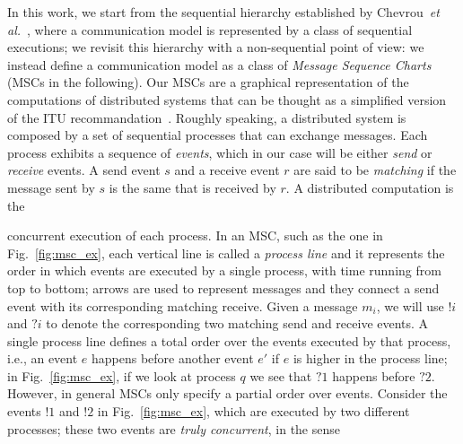 In this work, we start from the sequential hierarchy established by Chevrou~\emph{et al.}~\cite{DBLP:journals/fac/ChevrouHQ16}, where a
communication model is represented by a class of sequential executions; we revisit this hierarchy
with a non-sequential point of view: we instead define a communication model as a class of
\emph{Message Sequence Charts} (MSCs in the following).
Our MSCs are a graphical representation of the  computations of distributed systems that can be thought as a simplified
version of the ITU recommandation~\cite{messagesequencecharts}.
Roughly speaking, a distributed system is composed by a set of
sequential processes that can exchange messages. Each process exhibits a sequence of \emph{events}, which in our case will be either \emph{send}
or \emph{receive} events. A send event $s$ and a receive event $r$ are said to be \emph{matching} if the message sent by $s$ is the same  that is
received by $r$. A distributed computation is the \\
\noindent
\begin{minipage}[c]{10.5cm}
 concurrent execution of each process. In an MSC, such as the one in Fig.~\ref{fig:msc_ex}, each
vertical line is called a \emph{process line} and it represents the order in which events are executed by a single process, with time running from
top to bottom; arrows are used to represent messages and they connect a send event with its corresponding matching receive.
Given a message $m_i$, we will use $!i$ and $?i$ to denote the corresponding two matching send and receive events. A single process line defines a
total order over the events executed by that process, i.e., an event $e$ happens before another event $e'$ if $e$ is higher in the process line;
in Fig.~\ref{fig:msc_ex}, if we look at process $q$ we see that $?1$ happens before $?2$. However, in general MSCs only specify a partial order
over events. Consider the events $!1$ and $!2$ in Fig.~\ref{fig:msc_ex}, which are executed by two different processes; these two events are \emph{truly
concurrent},   in the sense
\end{minipage}
	\hfill \vspace{0,5mm}
